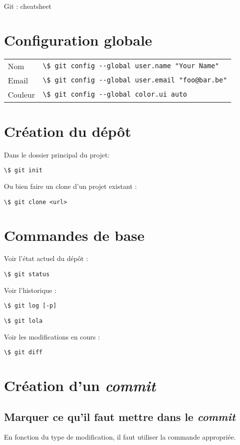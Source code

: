 \documentclass[a4paper,landscape,10pt]{article}
\newcommand{\shell}[1]{\lstinline{\$ #1}}
\begin{document}
\begin{center}
  {\huge Git : cheatsheet}
\end{center}

\section{Configuration globale}

\begin{tabular}{ll}
  Nom     & \shell{git config --global user.name "Your Name"} \\
  Email   & \shell{git config --global user.email "foo@bar.be"} \\
  Couleur & \shell{git config --global color.ui auto} \\
\end{tabular}

\section{Création du dépôt}

Dans le dossier principal du projet:

\shell{git init}

\medskip
Ou bien faire un clone d'un projet existant :

\shell{git clone <url>}

\section{Commandes de base}

Voir l'état actuel du dépôt :

\shell{git status}

\medskip
Voir l'historique :

\shell{git log [-p]}

\shell{git lola}

\medskip
Voir les modifications en cours :

\shell{git diff}

\section{Création d'un \emph{commit}}

\subsection*{Marquer ce qu'il faut mettre dans le \emph{commit}}

En fonction du type de modification, il faut utiliser la commande appropriée.
\end{document}
